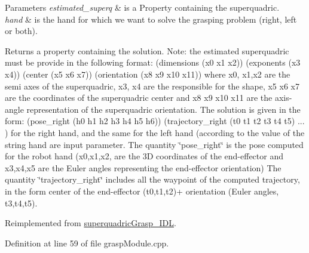 \begin{DoxyParams}{Parameters}
{\em estimated\+\_\+superq} & is a Property containing the superquadric. \\
\hline
{\em hand} & is the hand for which we want to solve the grasping problem (right, left or both). \\
\hline
\end{DoxyParams}
\begin{DoxyReturn}{Returns}
a property containing the solution. Note\+: the estimated superquadric must be provide in the following format\+: (dimensions (x0 x1 x2)) (exponents (x3 x4)) (center (x5 x6 x7)) (orientation (x8 x9 x10 x11)) where x0, x1,x2 are the semi axes of the superquadric, x3, x4 are the responsible for the shape, x5 x6 x7 are the coordinates of the superquadric center and x8 x9 x10 x11 are the axis-\/angle representation of the superquadric orientation. The solution is given in the form\+: (pose\+\_\+right (h0 h1 h2 h3 h4 h5 h6)) (trajectory\+\_\+right (t0 t1 t2 t3 t4 t5) ... ) for the right hand, and the same for the left hand (according to the value of the string hand are input parameter. The quantity \char`\"{}pose\+\_\+right\char`\"{} is the pose computed for the robot hand (x0,x1,x2, are the 3D coordinates of the end-\/effector and x3,x4,x5 are the Euler angles representing the end-\/effector orientation) The quantity \char`\"{}trajectory\+\_\+right\char`\"{} includes all the waypoint of the computed trajectory, in the form center of the end-\/effector (t0,t1,t2)+ orientation (Euler angles, t3,t4,t5). 
\end{DoxyReturn}


Reimplemented from \hyperlink{classsuperquadricGrasp__IDL_a595e98ed2a8fca7ac707b71f97d626d1}{superquadric\+Grasp\+\_\+\+I\+DL}.



Definition at line 59 of file grasp\+Module.\+cpp.


